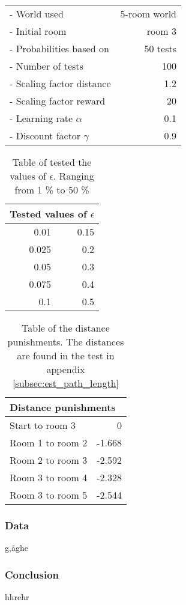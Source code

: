\documentclass[../Head/Main.tex]{subfiles}
\begin{document}
\begin{minipage}[c]{0.35\textwidth}
	\begin{tabular}{l r}
	- World used                & 5-room world\\
	- Initial room              & room 3\\	
	- Probabilities based on    & 50 tests\\	
	- Number of tests           & 100\\
	- Scaling factor distance   & 1.2\\
	- Scaling factor reward     & 20\\
	- Learning rate $\alpha$    & 0.1\\
	- Discount factor $\gamma$  & 0.9\\
	\end{tabular}
\end{minipage}	
\hfill
\begin{minipage}[c]{0.2\textwidth}
	\begin{table}[H]
		\centering
		\begin{tabular}{r r}
		\hline
		\multicolumn{2}{l}{\textbf{Tested values of $\epsilon$}}\\ 			\hline
		0.01   & 0.15\\
		0.025  & 0.2\\
		0.05   & 0.3\\
		0.075  & 0.4\\
		0.1    & 0.5\\
		\hline
		\end{tabular}
		\caption{Table of tested the values of $\epsilon$. Ranging from 1 \% to 50 \%}
		\label{tab:test_epsilon}
	\end{table}
\end{minipage}
\hfill
\begin{minipage}[c]{0.3\textwidth}
	\begin{table}[H]
	\centering
	\begin{tabular}{l r}
		\hline
		\multicolumn{2}{l}{\textbf{Distance punishments}}\\ 			\hline
		Start to room 3   & 0\\
		Room 1 to room 2  & -1.668\\
		Room 2 to room 3  & -2.592\\
		Room 3 to room 4  & -2.328\\
		Room 3 to room 5  & -2.544\\
		\hline
	\end{tabular}
	\caption{Table of the distance punishments. The distances are found in the test in appendix \ref{subsec:est_path_length}}
	\label{tab:distance_punishment_5_rooms}
\end{table}
\end{minipage}


\subsubsection{Data}
g,åghe

\subsubsection{Conclusion}
hhrehr
\end{document}
